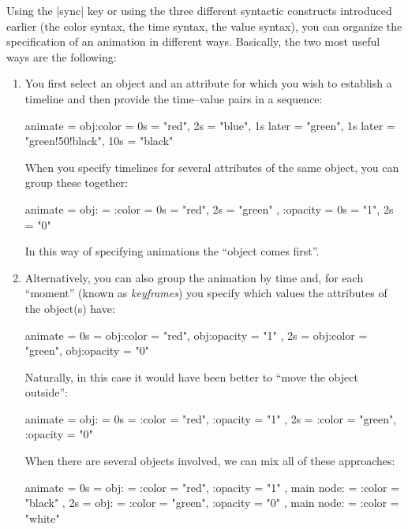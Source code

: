 Using the |sync| key or using the three different syntactic constructs
introduced earlier (the color syntax, the time syntax, the value syntax), you
can organize the specification of an animation in different ways. Basically,
the two most useful ways are the following:
%
\begin{enumerate}
    \item You first select an object and an attribute for which you wish to
        establish a timeline and then provide the time--value pairs in a
        sequence:
\begin{codeexample}
animate = {
  obj:color = {
    0s = "red",
    2s = "blue",
    1s later = "green",
    1s later = "green!50!black",
    10s = "black"
  }
}
\end{codeexample}
        When you specify timelines for several attributes of the same object,
        you can group these together:
\begin{codeexample}
animate = {
  obj: = {
    :color = { 0s = "red", 2s = "green" },
    :opacity = { 0s = "1", 2s = "0" }
  }
}
\end{codeexample}
        In this way of specifying animations the ``object comes first''.
    \item Alternatively, you can also group the animation by time and, for each
        ``moment'' (known as \emph{keyframes}) you specify which values the
        attributes of the object(s) have:
\begin{codeexample}
animate = {
  0s = {
    obj:color = "red",
    obj:opacity = "1"
  },
  2s = {
    obj:color = "green",
    obj:opacity = "0"
  }
}
\end{codeexample}
        Naturally, in this case it would have been better to ``move the object
        outside'':
\begin{codeexample}
animate = {
  obj: = {
    0s = {
      :color = "red",
      :opacity = "1"
    },
    2s = {
      :color = "green",
      :opacity = "0"
    }
  }
}
\end{codeexample}
        When there are several objects involved, we can mix all of these
        approaches:
\begin{codeexample}
animate = {
  0s = {
    obj: = {
      :color = "red",
      :opacity = "1"
    },
    main node: = {
      :color = "black"
    }
  },
  2s = {
    obj: = {
      :color = "green",
      :opacity = "0"
    },
    main node: = {
      :color = "white"
    }
  }
}
\end{codeexample}
\end{enumerate}


